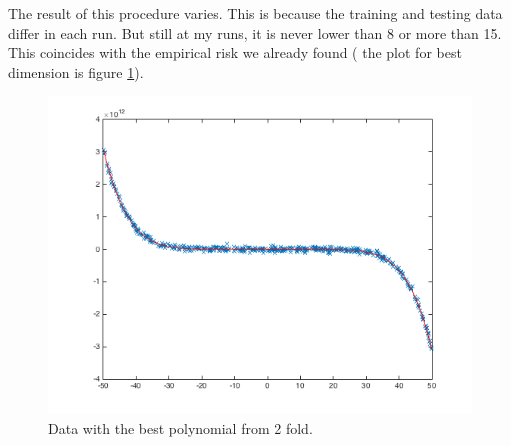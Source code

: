The result of this procedure varies. This is because the training and
testing data differ in each run. But still at my runs, it is never lower than 8 or more than 15. This coincides with the empirical risk
we already found ( the plot for best dimension is figure \ref{fig:best_d}).

\begin{figure}[!h]
{
    \includegraphics[width=\columnwidth]
    {figures/new2.png}
    \caption{\footnotesize{\bf} Data with the best polynomial from 2 fold.}
    \label{fig:best_d}
}
\end{figure}
\vspace{2 mm}
